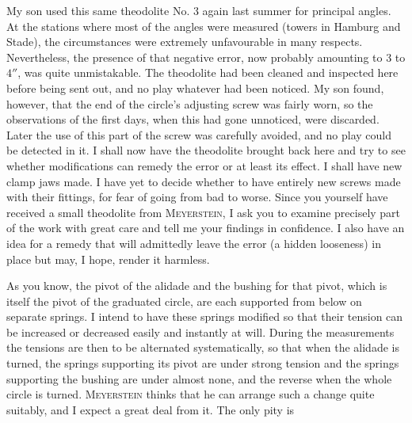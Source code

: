 \par\noindent\hspace*{\parindent}My son used this same theodolite No. 3 again last summer for principal angles. At the stations where most of the angles were measured (towers in Hamburg and Stade), the circumstances were extremely unfavourable in many respects. Nevertheless, the presence of that negative error, now probably amounting to 3 to $4''$, was quite unmistakable. The theodolite had been cleaned and inspected here before being sent out, and no play whatever had been noticed. My son found, however, that the end of the circle's adjusting screw was fairly worn, so the observations of the first days, when this had gone unnoticed, were discarded. Later the use of this part of the screw was carefully avoided, and no play could be detected in it. I shall now have the theodolite brought back here and try to see whether modifications can remedy the error or at least its effect. I shall have new clamp jaws made. I have yet to decide whether to have entirely new screws made with their fittings, for fear of going from bad to worse. Since you yourself have received a small theodolite from \textsc{Meyerstein}, I ask you to examine precisely  part of the work with great care and tell me your findings in confidence. I also have an idea for a remedy that will admittedly leave the error (a hidden looseness) in place but may, I hope, render it harmless.

\par\noindent\hspace*{\parindent}As you know, the pivot of the alidade and the bushing for that pivot, which is itself the pivot of the graduated circle, are each supported from below on separate springs. I intend to have these springs modified so that their tension can be increased or decreased easily and instantly at will. During the measurements the tensions are then to be alternated systematically, so that when the alidade is turned, the springs supporting its pivot are under strong tension and the springs supporting the bushing are under almost none, and the reverse when the whole circle is turned. \textsc{Meyerstein} thinks that he can arrange such a change quite suitably, and I expect a great deal from it. The only pity is
\par\medskip\noindent{}\par
